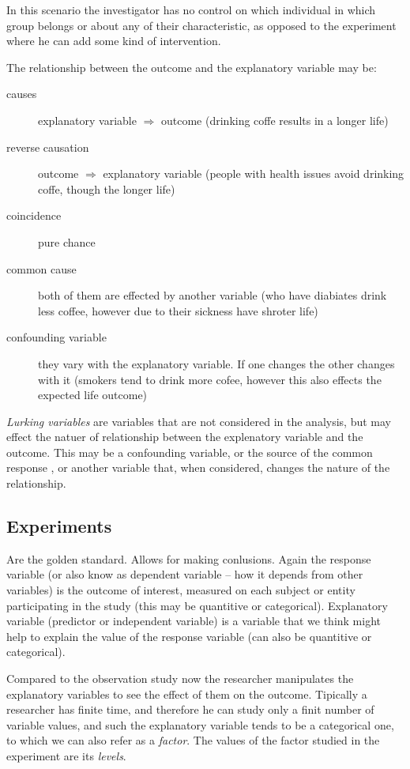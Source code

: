 In this scenario the investigator has no control on which individual in which
group belongs or about any of their characteristic, as opposed to the experiment
where he can add some kind of intervention. 

The relationship between the outcome and the explanatory variable may be:

\begin{description}
  \item[causes] explanatory variable $\Rightarrow$ outcome (drinking coffe
  results in a longer life)
  \item[reverse causation] outcome $\Rightarrow$ explanatory variable (people
  with health issues avoid drinking coffe, though the longer life)
  \item[coincidence] pure chance
  \item[common cause] both of them are effected by another variable (who have
  diabiates drink less coffee, however due to their sickness have shroter life)
  \item[confounding variable] they vary with the explanatory variable. If one
  changes the other changes with it (smokers tend to drink more cofee, however
  this also effects the expected life outcome)
\end{description}

\emph{Lurking variables} are variables that are not considered in the analysis,
but may effect the natuer of relationship between the explenatory variable and
the outcome. This may be a confounding variable, or the source of the common
response , or another variable that, when considered, changes the nature of the
relationship.

\subsection{Experiments}

Are the golden standard. Allows for making conlusions. Again the response
variable (or also know as dependent variable -- how it depends from other
variables) is the outcome of interest, measured on each subject or entity
participating in the study (this may be quantitive or categorical). Explanatory
variable (predictor or independent variable) is a variable that we think might
help to explain the value of the response variable (can also be quantitive or
categorical).

Compared to the observation study now the researcher manipulates the explanatory
variables to see the effect of them on the outcome. Tipically a researcher has
finite time, and therefore he can study only a finit number of variable values,
and such the explanatory variable tends to be a categorical one, to which we can
also refer as a \emph{factor}. The values of the factor studied in the
experiment are its \emph{levels}.


